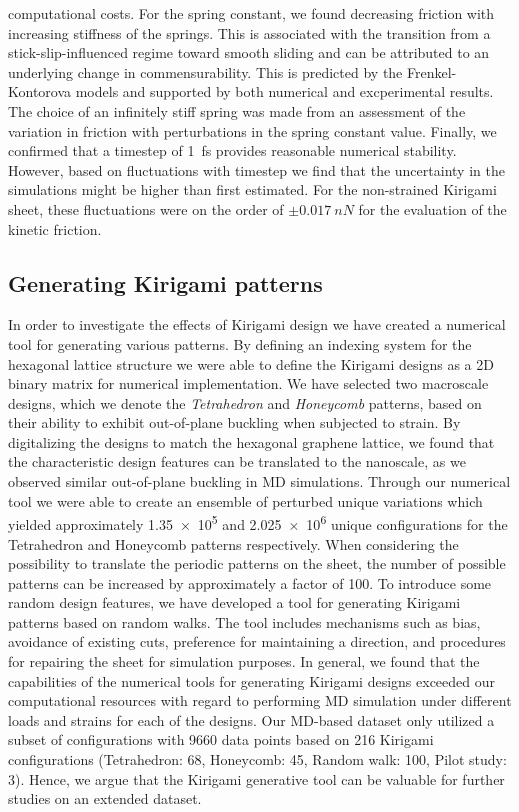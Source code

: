 computational costs. For the spring constant, we found decreasing friction with
increasing stiffness of the springs. This is associated with the transition from
a stick-slip-influenced regime toward smooth sliding and can be attributed to an underlying change in commensurability. This is predicted by the Frenkel-Kontorova models and supported by both numerical and excperimental results. The choice of an
infinitely stiff spring was made from an assessment of the variation in friction with perturbations in the spring constant value. Finally, we
confirmed that a timestep of \SI{1}{fs} provides reasonable numerical stability.
However, based on fluctuations with timestep we find that the uncertainty in the
simulations might be higher than first estimated. For the non-strained Kirigami sheet, these fluctuations were on the order of $\pm \SI{0.017}{nN}$ for the evaluation of the kinetic friction.


\subsection{Generating Kirigami patterns}
In order to investigate the effects of Kirigami design we have created a
numerical tool for generating various patterns. By defining an indexing system
for the hexagonal lattice structure we were able to define the Kirigami designs
as a 2D binary matrix for numerical implementation. We have selected two
macroscale designs, which we denote the \textit{Tetrahedron} and
\textit{Honeycomb} patterns, based on their ability to exhibit out-of-plane
buckling when subjected to strain. By digitalizing the designs to match the
hexagonal graphene lattice, we found that the characteristic design features can
be translated to the nanoscale, as we observed similar out-of-plane buckling in
\acrshort{MD} simulations. Through our numerical tool we were able to create an
ensemble of perturbed unique variations which yielded approximately \num{1.35e5}
and \num{2.025e6} unique configurations for the Tetrahedron and Honeycomb
patterns respectively. When considering the possibility to translate the
periodic patterns on the sheet, the number of possible patterns can be increased
by approximately a factor of 100. To introduce some random design features, we
have developed a tool for generating Kirigami patterns based on random walks.
The tool includes mechanisms such as bias, avoidance of existing cuts,
preference for maintaining a direction, and procedures for repairing the sheet
for simulation purposes. In general, we found that the capabilities of the
numerical tools for generating Kirigami designs exceeded our computational
resources with regard to performing \acrshort{MD} simulation under different
loads and strains for each of the designs. Our \acrshort{MD}-based dataset only
utilized a subset of configurations with 9660 data points based on 216 Kirigami
configurations (Tetrahedron: 68, Honeycomb: 45, Random walk: 100, Pilot study:
3). Hence, we argue that the Kirigami generative tool can be valuable for
further studies on an extended dataset.


